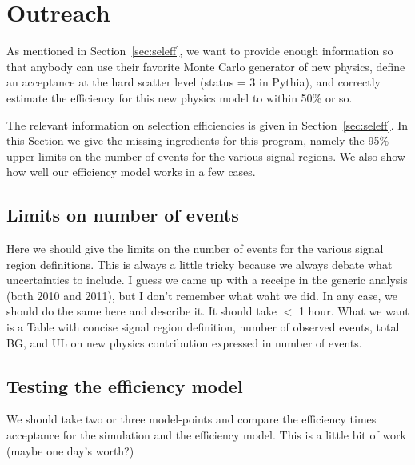 \section{Outreach}
\label{sec:outreach}
As mentioned in Section~\ref{sec:seleff}, we want to provide 
enough information so that anybody can use their favorite Monte Carlo
generator of new physics, define an acceptance at the hard 
scatter level (status = 3 in Pythia), and correctly estimate
the efficiency for this new physics model to within 50\% or so.

The relevant information on selection efficiencies is 
given in Section~\ref{sec:seleff}.  In this Section we give the 
missing ingredients for this program, namely the 
95\% upper limits on the number of events for the various 
signal regions.  We also show how well our efficiency model 
works in a few cases.

\subsection{Limits on number of events}
\label{sec:outreachlimits}
Here we should give the limits on the number of events for the various 
signal region definitions.  This is always a little tricky because
we always debate what uncertainties to include.  I guess we 
came up with a receipe in the generic analysis (both 2010 and
2011), but I don't remember what waht we did.  In any case, we should 
do the same here and describe it.  It should take $<$ 1 hour.
What we want is a Table with concise signal region definition, 
number of observed events, total BG, and UL on new physics contribution
expressed in number of events.

\subsection{Testing the efficiency model}
\label{sec:outreachtest}
We should take two or three model-points and compare the efficiency times
acceptance for the simulation and the efficiency model.  This is 
a little bit of work (maybe one day's worth?)
